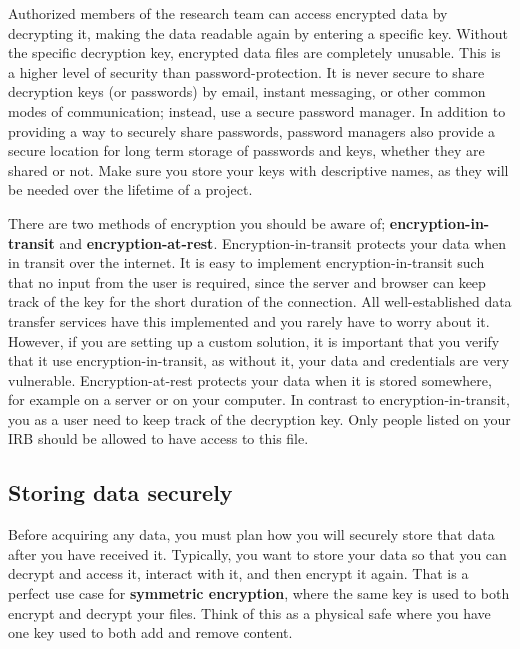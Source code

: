 Authorized members of the research team can access encrypted data by decrypting it,
making the data readable again by entering a specific key. 
Without the specific decryption key,
encrypted data files are completely unusable. 
This is a higher level of security than password-protection.
It is never secure to share decryption keys (or passwords) by email,
instant messaging, or other common modes of communication;
instead, use a secure password manager.
In addition to providing a way to securely share passwords,
password managers also provide a secure location
for long term storage of passwords and keys,
whether they are shared or not.
Make sure you store your keys with descriptive names,
as they will be needed over the lifetime of a project.

There are two methods of encryption you should be aware of;
\textbf{encryption-in-transit}
and \textbf{encryption-at-rest}.
Encryption-in-transit protects your data when in transit over the internet.
It is easy to implement encryption-in-transit such that no input from the user is required,
since the server and browser can keep track of the key for the short duration of the connection.
All well-established data transfer services have this implemented and you rarely have to worry about it.
However, if you are setting up a custom solution,
it is important that you verify that it use encryption-in-transit,
as without it, your data and credentials are very vulnerable.
Encryption-at-rest protects your data when it is stored somewhere,
for example on a server or on your computer.
In contrast to encryption-in-transit,
you as a user need to keep track of the decryption key.
Only people listed on your IRB should be allowed to have access to this file.

\subsection{Storing data securely}
Before acquiring any data, you must plan how you will securely store that data after you have received it.
Typically, you want to store your data so that you can decrypt and access it,
interact with it, and then encrypt it again.
That is a perfect use case for \textbf{symmetric encryption},
where the same key is used to both encrypt and decrypt your files.
Think of this as a physical safe where you have one key
used to both add and remove content.

